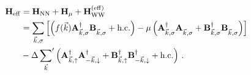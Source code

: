 \begin{align}
    \oHeff &= \oHNN + \oH_\mu + \oHWWeff \\
    &= \sum_{\vk, \sigma} \left[\left(f(\vk) \oakd \obk +\hc\right) - \mu \left( \oakd \oak + \obkd \obk \right) \right]  \\
    &- \Delta \sump{\vk} \left(\oadup \oaddown + \obdup \obddown + \hc \right) \notag \, .
\end{align}\\

